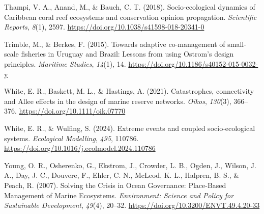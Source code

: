 \documentclass[
  12pt,
]{article}
\newlength{\cslhangindent}
\newenvironment{CSLReferences}[2] %
 {\begin{list}{}{%
  \setlength{\itemindent}{0pt}
  \setlength{\leftmargin}{0pt}
  \setlength{\parsep}{0pt}
  \ifodd #1
   \setlength{\leftmargin}{\cslhangindent}
   \setlength{\itemindent}{-1\cslhangindent}
  \fi
  \setlength{\itemsep}{#2\baselineskip}}}
 {\end{list}}
\begin{document}
\begin{CSLReferences}{1}{2}
Thampi, V. A., Anand, M., \& Bauch, C. T. (2018). Socio-ecological dynamics of {Caribbean} coral reef ecosystems and conservation opinion propagation. \emph{Scientific Reports}, \emph{8}(1), 2597. \url{https://doi.org/10.1038/s41598-018-20341-0}

Trimble, M., \& Berkes, F. (2015). Towards adaptive co-management of small-scale fisheries in {Uruguay} and {Brazil}: Lessons from using {Ostrom}'s design principles. \emph{Maritime Studies}, \emph{14}(1), 14. \url{https://doi.org/10.1186/s40152-015-0032-y}

White, E. R., Baskett, M. L., \& Hastings, A. (2021). Catastrophes, connectivity and {Allee} effects in the design of marine reserve networks. \emph{Oikos}, \emph{130}(3), 366--376. \url{https://doi.org/10.1111/oik.07770}

White, E. R., \& Wulfing, S. (2024). Extreme events and coupled socio-ecological systems. \emph{Ecological Modelling}, \emph{495}, 110786. \url{https://doi.org/10.1016/j.ecolmodel.2024.110786}

Young, O. R., Osherenko, G., Ekstrom, J., Crowder, L. B., Ogden, J., Wilson, J. A., Day, J. C., Douvere, F., Ehler, C. N., McLeod, K. L., Halpren, B. S., \& Peach, R. (2007). Solving the {Crisis} in {Ocean Governance}: {Place-Based Management} of {Marine Ecosystems}. \emph{Environment: Science and Policy for Sustainable Development}, \emph{49}(4), 20--32. \url{https://doi.org/10.3200/ENVT.49.4.20-33}

\end{CSLReferences}
\end{document}
